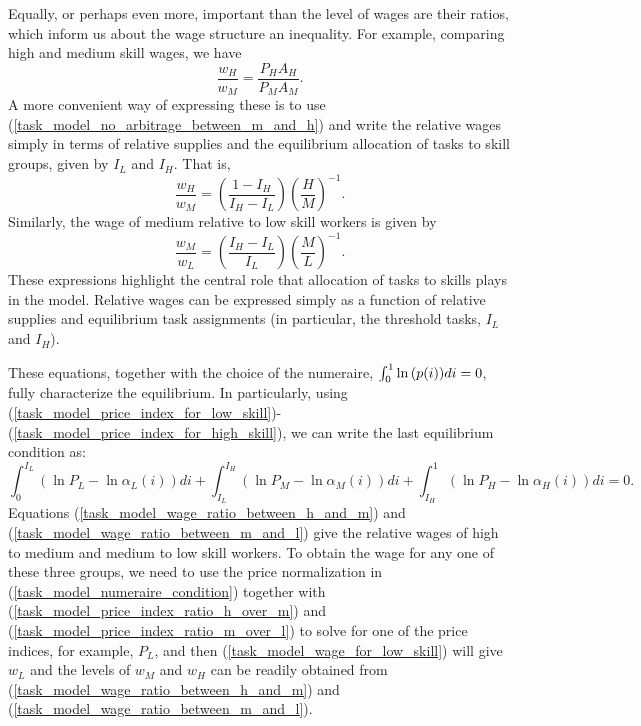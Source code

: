 \documentclass[12pt]{article}
\newcommand{\highlightB}[1]{{\emph{\color{MyBlue}{#1}}}}
\theoremstyle{definition}
\begin{document}
Equally, or perhaps even more, important than the level of wages are their ratios, which inform us about the wage structure an inequality. For example, comparing high and medium skill wages, we have 
$$
\frac{w_H}{w_M} = \frac{P_H A_H}{P_M A_M}.
$$
A more convenient way of expressing these is to use (\ref{task_model_no_arbitrage_between_m_and_h}) and write the relative wages simply in terms of relative supplies and the equilibrium allocation of tasks to skill groups, given by $I_L$ and $I_H$. That is,
\begin{equation}
    \label{task_model_wage_ratio_between_h_and_m} 
	\frac{w_H}{w_M} = \left(\frac{1-I_H}{I_H-I_L}\right)\left(\frac{H}{M}\right)^{-1} .
\end{equation}
Similarly, the wage of medium relative to low skill workers is given by
\begin{equation}
    \label{task_model_wage_ratio_between_m_and_l} 
	\frac{w_M}{w_L}=\left(\frac{I_H-I_L}{I_L}\right)\left(\frac{M}{L}\right)^{-1}.
\end{equation}
These expressions highlight the central role that allocation of tasks to skills plays in the model. Relative wages can be expressed simply as a function of relative supplies and equilibrium task assignments (in particular, the threshold tasks, $I_L$ and $I_H$).

These equations, together with the choice of the numeraire, $\int_0^1 \ln\of{p\of{i}} di = 0$, fully characterize the equilibrium. In particularly, using (\ref{task_model_price_index_for_low_skill})-(\ref{task_model_price_index_for_high_skill}), we can write the last equilibrium condition as:
\begin{equation} 
    \label{task_model_numeraire_condition}
	\int_0^{I_L}\left(\ln P_L-\ln \alpha_L(i)\right) d i+\int_{I_L}^{I_H}\left(\ln P_M-\ln \alpha_M(i)\right) d i + \int_{I_H}^1\left(\ln P_H-\ln \alpha_H(i)\right) d i=0 .
\end{equation}
Equations (\ref{task_model_wage_ratio_between_h_and_m}) and (\ref{task_model_wage_ratio_between_m_and_l}) give the relative wages of high to medium and medium to low skill workers. To obtain the wage \highlightB{level} for any one of these three groups, we need to use the price normalization in (\ref{task_model_numeraire_condition}) together with (\ref{task_model_price_index_ratio_h_over_m}) and (\ref{task_model_price_index_ratio_m_over_l}) to solve for one of the price indices, for example, $P_L$, and then (\ref{task_model_wage_for_low_skill}) will give $w_L$ and the levels of $w_M$ and $w_H$ can be readily obtained from (\ref{task_model_wage_ratio_between_h_and_m}) and (\ref{task_model_wage_ratio_between_m_and_l}).
\end{document}
